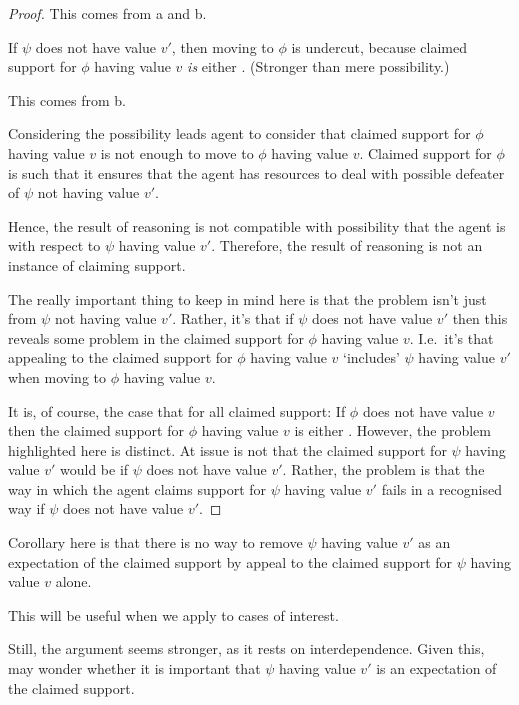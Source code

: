 \begin{note}
\begin{proof}
    This comes from a and b.

    If \(\psi\) does not have value \(v'\), then moving to \(\phi\) is undercut, because claimed support for \(\phi\) having value \(v\) \emph{is} either \mom{}. (Stronger than mere possibility.)

    This comes from b.

    Considering the possibility leads agent to consider that claimed support for \(\phi\) having value \(v\) is not enough to move to \(\phi\) having value \(v\).
    Claimed support for \(\phi\) is such that it ensures that the agent has resources to deal with possible defeater of \(\psi\) not having value \(v'\).

    Hence, the result of reasoning is not compatible with possibility that the agent is \mom{} with respect to \(\psi\) having value \(v'\).
    Therefore, the result of reasoning is not an instance of claiming support.

    {
      \color{red}
      The really important thing to keep in mind here is that the problem isn't just from \(\psi\) not having value \(v'\).
      Rather, it's that if \(\psi\) does not have value \(v'\) then this reveals some problem in the claimed support for \(\phi\) having value \(v\).
      I.e.\ it's that appealing to the claimed support for \(\phi\) having value \(v\) `includes' \(\psi\) having value \(v'\) when moving to \(\phi\) having value \(v\).

      It is, of course, the case that for all claimed support:
      If \(\phi\) does not have value \(v\) then the claimed support for \(\phi\) having value \(v\) is either \mom{}.
      However, the problem highlighted here is distinct.
      At issue is not that the claimed support for \(\psi\) having value \(v'\) would be \mom{} if \(\psi\) does not have value \(v'\).
      Rather, the problem is that the way in which the agent claims support for \(\psi\) having value \(v'\) fails in a recognised way if \(\psi\) does not have value \(v'\).
    }
  \end{proof}

  Corollary here is that there is no way to remove \(\psi\) having value \(v'\) as an expectation of the claimed support by appeal to the claimed support for \(\psi\) having value \(v\) alone.

  This will be useful when we apply \nI{} to cases of interest.

  Still, the argument seems stronger, as it rests on interdependence.
  Given this, may wonder whether it is important that \(\psi\) having value \(v'\) is an expectation of the claimed support.


\end{note}
